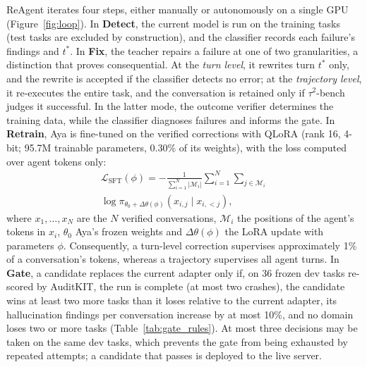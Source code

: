 \documentclass[11pt]{article}
\begin{document}
ReAgent iterates four steps, either manually or autonomously on a single GPU (Figure~\ref{fig:loop}). In \textbf{Detect}, the current model is run on the training tasks (test tasks are excluded by construction), and the classifier records each failure's findings and $t^*$. In \textbf{Fix}, the teacher repairs a failure at one of two granularities, a distinction that proves consequential. At the \emph{turn level}, it rewrites turn $t^*$ only, and the rewrite is accepted if the classifier detects no error; at the \emph{trajectory level}, it re-executes the entire task, and the conversation is retained only if $\tau^2$-bench judges it successful. In the latter mode, the outcome verifier determines the training data, while the classifier diagnoses failures and informs the gate. In \textbf{Retrain}, Aya \citep{Dang2024AyaExpanse} is fine-tuned on the verified corrections with QLoRA \citep{Dettmers2023QLoRA} (rank 16, 4-bit; 95.7M trainable parameters, 0.30\% of its weights), with the loss computed over agent tokens only:
\begin{multline}
\mathcal{L}_{\text{SFT}}(\phi) = -\frac{1}{\sum_{i=1}^N |\mathcal{M}_i|} \sum_{i=1}^N \sum_{j \in \mathcal{M}_i} \\
\log \pi_{\theta_0 + \Delta\theta(\phi)}\!\left(x_{i,j} \mid x_{i,<j}\right),
\end{multline}
where $x_1,\dots,x_N$ are the $N$ verified conversations, $\mathcal{M}_i$ the positions of the agent's tokens in $x_i$, $\theta_0$ Aya's frozen weights and $\Delta\theta(\phi)$ the LoRA update with parameters $\phi$. Consequently, a turn-level correction supervises approximately 1\% of a conversation's tokens, whereas a trajectory supervises all agent turns. In \textbf{Gate}, a candidate replaces the current adapter only if, on 36 frozen dev tasks re-scored by AuditKIT, the run is complete (at most two crashes), the candidate wins at least two more tasks than it loses relative to the current adapter, its hallucination findings per conversation increase by at most 10\%, and no domain loses two or more tasks (Table~\ref{tab:gate_rules}). At most three decisions may be taken on the same dev tasks, which prevents the gate from being exhausted by repeated attempts; a candidate that passes is deployed to the live server.
\end{document}
